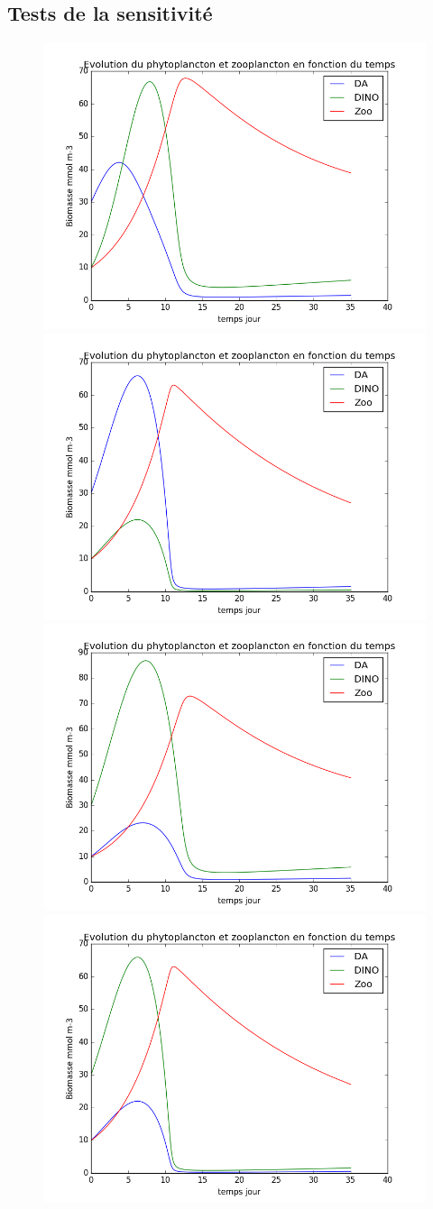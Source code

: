 \subsection{Tests de la sensitivité}

\begin{figure}
  \includegraphics[width=.5\textwidth]{partie2/test1sel.png}\hfill
  \includegraphics[width=.5\textwidth]{partie2/test1nonsel.png}\\
  \includegraphics[width=.5\textwidth]{partie2/test2sel.png}\hfill
  \includegraphics[width=.5\textwidth]{partie2/test2nonsel.png}
  \caption{\todo}
  \label{fig:partie2Test1}
\end{figure}
